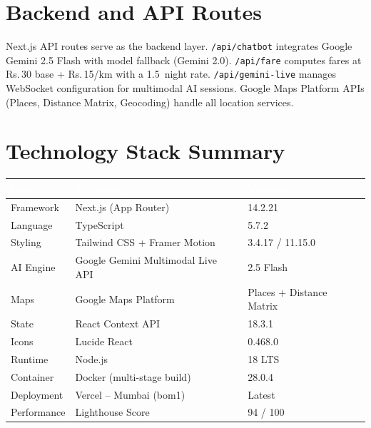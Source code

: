 \documentclass[12pt,a4paper,oneside]{report}
\begin{document}
\section{Backend and API Routes}

Next.js API routes serve as the backend layer. \texttt{/api/chatbot} integrates
Google Gemini 2.5 Flash with model fallback (Gemini 2.0). \texttt{/api/fare} computes
fares at Rs.\,30 base + Rs.\,15/km with a 1.5\texttimes\ night rate.
\texttt{/api/gemini-live} manages WebSocket configuration for multimodal AI sessions.
Google Maps Platform APIs (Places, Distance Matrix, Geocoding) handle all location
services.

\section{Technology Stack Summary}

\vspace{6pt}
\begin{center}
\begin{tabular}{|L{0.25\textwidth}|L{0.42\textwidth}|L{0.27\textwidth}|}
\hline
{}
\textcolor{white}{\textbf{Layer}} &
\textcolor{white}{\textbf{Technology}} &
\textcolor{white}{\textbf{Version}} \\
\hline
Framework        & Next.js (App Router)                    & 14.2.21 \\
Language         & TypeScript                              & 5.7.2 \\
Styling          & Tailwind CSS + Framer Motion            & 3.4.17 / 11.15.0 \\
AI Engine        & Google Gemini Multimodal Live API       & 2.5 Flash \\
Maps             & Google Maps Platform                    & Places + Distance Matrix \\
State            & React Context API                       & 18.3.1 \\
Icons            & Lucide React                            & 0.468.0 \\
Runtime          & Node.js                                 & 18 LTS \\
Container        & Docker (multi-stage build)              & 28.0.4 \\
Deployment       & Vercel -- Mumbai (bom1)                 & Latest \\
Performance      & Lighthouse Score                        & 94 / 100 \\
\hline
\end{tabular}
\end{center}
\end{document}
